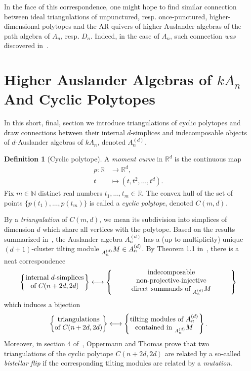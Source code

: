 \documentclass[a4paper,oneside,svgnames]{amsart}
\theoremstyle{plain}
\theoremstyle{definition}
\newtheorem{definition}[theorem]{Definition}
\let\mod\relax
\DeclareMathOperator{\mod}{mod}
\begin{document}
 In the face of this correspondence, one might hope to find similar connection
 between ideal triangulations of unpunctured, resp. once-punctured,
 higher-dimensional polytopes and the AR quivers of higher Auslander algebras of
 the path algebra of $A_n$, resp. $D_n$. Indeed, in the case of $A_n$, such
 connection \emph{was} discovered in~\cite{ot}.

 \section{Higher Auslander Algebras of $kA_n$ And Cyclic Polytopes}
 \label{sec:higher-auslander-algebras-of-kan-and-cyclic-polytopes}

 In this short, final, section we introduce triangulations of cyclic polytopes
 and draw connections between their internal $d$-simplices and indecomposable
 objects of $d$-Auslander algebras of $kA_n$, denoted $A^{(d)}_n$.

 \begin{definition}[Cyclic polytope]
  A \emph{moment curve} in $\mathbb{R}^{d}$ is the continuous map
  \begin{align*}
   p:\mathbb{R} & \to \mathbb{R}^{d},\\
   t &\mapsto (t,t^2,\ldots,t^d).
  \end{align*}
  Fix $m \in \mathbb{N}$ distinct real numbers $t_1,\ldots,t_m \in \mathbb{R}$.
  The convex hull of the set of points $\{p(t_1),\ldots,p(t_m)\}$ is called a
  \emph{cyclic polytope}, denoted $C(m,d)$.
 \end{definition}
 By a \emph{triangulation} of $C(m,d)$, we mean its subdivision into simplices
 of dimension $d$ which share all vertices with the polytope. Based on the
 results summarized in~, the Auslander algebra
 $A^{(d)}_n$ has a (up to multiplicity) unique $(d+1)$-cluster tilting module
 $\prescript{}{A^{(d)}_n}M \in \mod A^{(d)}_n$. By Theorem 1.1 in~\cite{ot},
 there is a neat correspondence
 \[
  \left\{ \parbox{.25\textwidth}{
    \centering
    internal $d$-simplices \\ of $C(n+2d,2d)$
  } \right\} \longleftrightarrow 
  \left\{ \parbox{.5\textwidth}{
   \centering
   indecomposable non-projective-injective\\
   direct summands of $\prescript{}{A^{(d)}_n}M$
  } \right\}
 \]
 which induces a bijection
 \[
  \left\{ \parbox{.2\textwidth}{
    \centering
    triangulations \\ of $C(n+2d,2d)$
  } \right\} \longleftrightarrow 
  \left\{ \parbox{.29\textwidth}{
   \centering
   tilting modules of $A^{(d)}_n$ \\
   contained in $\prescript{}{A^{(d)}_n}M$
  } \right\}.
 \]
 Moreover, in section 4 of~\cite{ot}, Oppermann and Thomas prove that two
 triangulations of the cyclic polytope $C(n+2d,2d)$ are related by a so-called
 \emph{bistellar flip} if the corresponding tilting modules are related by a
 \emph{mutation}.
\end{document}
